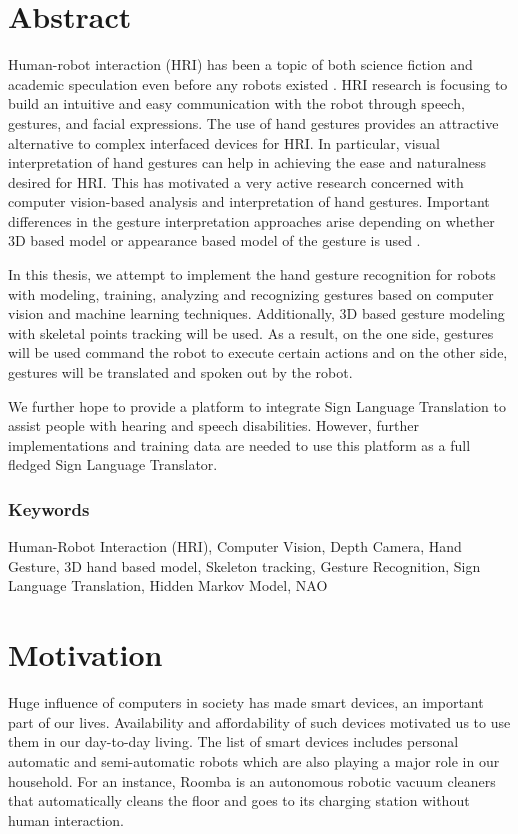 \chapter{Abstract}
Human-robot interaction (HRI) has been a topic of both science fiction and academic speculation even before any robots existed \cite{7}. HRI research is focusing to build an intuitive and easy communication with the robot through speech, gestures, and facial expressions. The use of hand gestures provides an attractive alternative to complex interfaced devices for HRI. In particular, visual interpretation of hand gestures can help in achieving the ease and naturalness desired for HRI. This has motivated a very active research concerned with computer vision-based analysis and interpretation of hand gestures. Important differences in the gesture interpretation approaches arise depending on whether 3D based model or appearance based model of the gesture is used \cite{3}. 

In this thesis, we attempt to implement the hand gesture recognition for robots with modeling, training, analyzing and recognizing gestures based on computer vision and machine learning techniques. Additionally, 3D based gesture modeling with skeletal points tracking will be used. As a result, on the one side, gestures will be used command the robot to execute certain actions and on the other side, gestures will be translated and spoken out by the robot.

We further hope to provide a platform to integrate Sign Language Translation to assist people with hearing and speech disabilities. However, further implementations and training data are needed to use this platform as a full fledged Sign Language Translator.

\subsection*{Keywords} Human-Robot Interaction (HRI), Computer Vision, Depth Camera, Hand Gesture, 3D hand based model, Skeleton tracking, Gesture Recognition, Sign Language Translation, Hidden Markov Model, NAO

\chapter{Motivation} Huge influence of computers in society has made smart devices, an important part of our lives. Availability and affordability of such devices motivated us to use them in our day-to-day living. The list of smart devices includes personal automatic and semi-automatic robots which are also playing a major role in our household. For an instance, Roomba \cite{8} is an autonomous robotic vacuum cleaners that automatically cleans the floor and goes to its charging station without human interaction.

